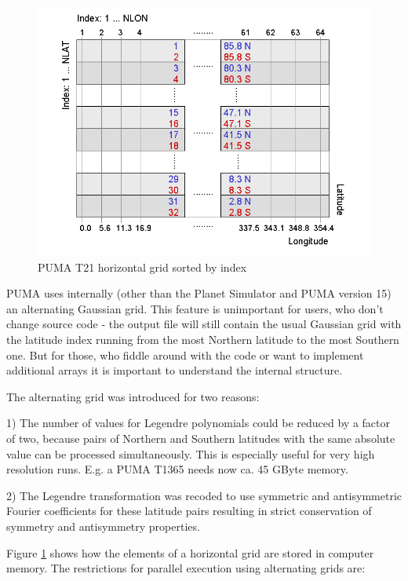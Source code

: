 
\begin{figure}
   \centering
   \includegraphics[width=14cm]{Pics/PUMA_alternate_grid.png}
   \caption[]{PUMA T21 horizontal grid sorted by index}
   \label{pumat21igrid}
\end{figure}

PUMA uses internally (other than the Planet Simulator and PUMA version 15) an alternating Gaussian grid.
This feature is unimportant for users, who don't change source code - the output file
will still contain the usual Gaussian grid with the latitude index running from the most Northern latitude
to the most Southern one. But for those, who fiddle around with the code or want to implement additional
arrays it is important to understand the internal structure.

The alternating grid was introduced for two reasons:

1) The number of values for Legendre polynomials could be reduced by a factor of two, because 
pairs of Northern and Southern latitudes with the same absolute value can be processed
simultaneously. This is especially useful for very high resolution runs.
E.g. a PUMA T1365 needs now ca. 45 GByte memory.

2) The Legendre transformation was recoded to use symmetric and antisymmetric Fourier
coefficients for these latitude pairs resulting in strict conservation of symmetry
and antisymmetry properties.

Figure \ref{pumat21igrid} shows how the elements of a horizontal grid
are stored in computer memory. The restrictions for parallel execution
using alternating grids are:

